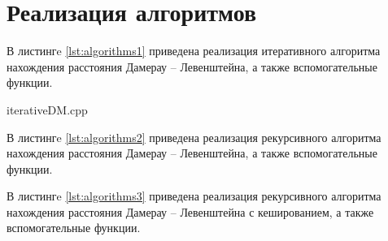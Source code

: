 \section{Реализация алгоритмов}

В листингe \ref{lst:algorithms1} приведена реализация итеративного алгоритма нахождения расстояния Дамерау -- Левенштейна, а также вспомогательные функции.

%
\begin{lstinputlisting}[
	caption={Итеративный алгоритм},
	label={lst:algorithms1}
	]{iterativeDM.cpp}
\end{lstinputlisting}

В листингe \ref{lst:algorithms2} приведена реализация рекурсивного алгоритма нахождения расстояния Дамерау -- Левенштейна, а также вспомогательные функции.



В листингe \ref{lst:algorithms3} приведена реализация рекурсивного алгоритма нахождения расстояния Дамерау -- Левенштейна с кешированием, а также вспомогательные функции.
\pagebreak
